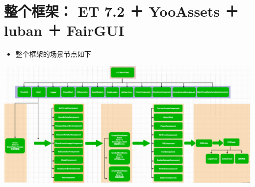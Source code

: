 \documentclass[9pt, b5paper]{article}
\begin{document}
\section{整个框架： ET 7.2 ＋ YooAssets ＋ luban ＋ FairGUI}
\label{sec-5}
\begin{itemize}
\item 整个框架的场景节点如下
\end{itemize}

\includegraphics[width=.9\linewidth]{./pic/ET_20230512_143227.png}
\end{document}
